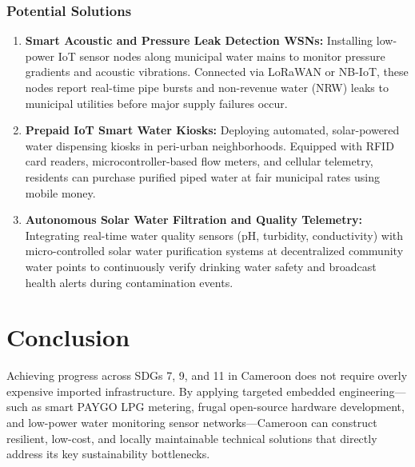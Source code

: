 \documentclass[11pt, a4paper]{article}
\begin{document}
\subsubsection*{Potential Solutions}
\begin{enumerate}
  \item \textbf{Smart Acoustic and Pressure Leak Detection WSNs:} Installing low-power IoT sensor nodes along municipal water mains to monitor pressure gradients and acoustic vibrations. Connected via LoRaWAN or NB-IoT, these nodes report real-time pipe bursts and non-revenue water (NRW) leaks to municipal utilities before major supply failures occur.
  \item \textbf{Prepaid IoT Smart Water Kiosks:} Deploying automated, solar-powered water dispensing kiosks in peri-urban neighborhoods. Equipped with RFID card readers, microcontroller-based flow meters, and cellular telemetry, residents can purchase purified piped water at fair municipal rates using mobile money.
  \item \textbf{Autonomous Solar Water Filtration and Quality Telemetry:} Integrating real-time water quality sensors ($\text{pH}$, turbidity, conductivity) with micro-controlled solar water purification systems at decentralized community water points to continuously verify drinking water safety and broadcast health alerts during contamination events.
\end{enumerate}

\section{Conclusion}
Achieving progress across SDGs 7, 9, and 11 in Cameroon does not require overly expensive imported infrastructure. By applying targeted embedded engineering—such as smart PAYGO LPG metering, frugal open-source hardware development, and low-power water monitoring sensor networks—Cameroon can construct resilient, low-cost, and locally maintainable technical solutions that directly address its key sustainability bottlenecks.
\end{document}
